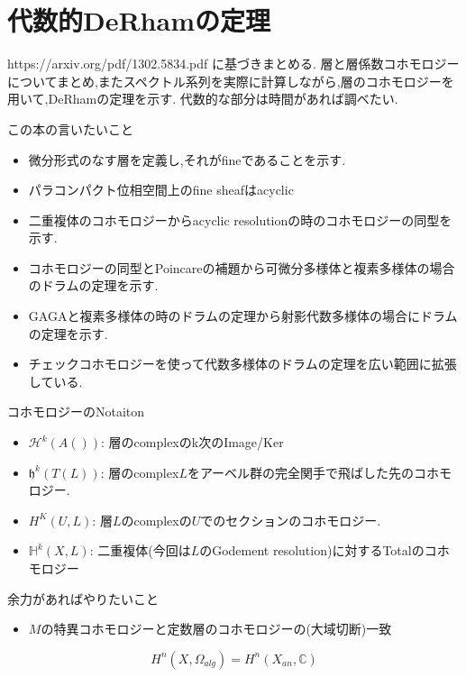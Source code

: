 \chapter{代数的DeRhamの定理}
https://arxiv.org/pdf/1302.5834.pdf
に基づきまとめる.
層と層係数コホモロジーについてまとめ,またスペクトル系列を実際に計算しながら,層のコホモロジーを用いて,DeRhamの定理を示す.
代数的な部分は時間があれば調べたい.

この本の言いたいこと
\begin{itemize}
  \item 微分形式のなす層を定義し,それがfineであることを示す.
  \item パラコンパクト位相空間上のfine sheafはacyclic
  \item 二重複体のコホモロジーからacyclic resolutionの時のコホモロジーの同型を示す.
  \item コホモロジーの同型とPoincareの補題から可微分多様体と複素多様体の場合のドラムの定理を示す.
  \item GAGAと複素多様体の時のドラムの定理から射影代数多様体の場合にドラムの定理を示す.
  \item チェックコホモロジーを使って代数多様体のドラムの定理を広い範囲に拡張している.
\end{itemize}

コホモロジーのNotaiton
\begin{itemize}
  \item $\mathcal{H}^k(A())$: 層のcomplexのk次のImage/Ker
  \item $\mathfrak{h}^k(T(L))$: 層のcomplex$L$をアーベル群の完全関手で飛ばした先のコホモロジー.
  \item $H^K(U,L)$: 層$L$のcomplexの$U$でのセクションのコホモロジー.
  \item $\mathbb{H}^k(X, L)$: 二重複体(今回は$L$のGodement resolution)に対するTotalのコホモロジー
\end{itemize}
余力があればやりたいこと
\begin{itemize}
  \item $M$の特異コホモロジーと定数層のコホモロジーの(大域切断)一致
\end{itemize}

\begin{thm}
\begin{equation*}
H^n(X,\Omega_{alg}) = H^n(X_{an},\mathbb{C})
\end{equation*}
\end{thm}


